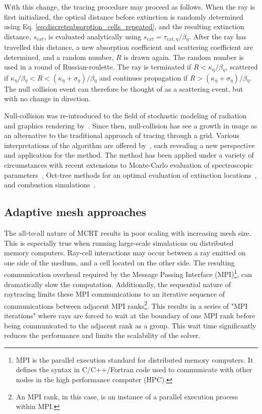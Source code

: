 With this change, the tracing procedure may proceed as follows. When the ray is first initialized, the optical distance before extinction is randomly determined using Eq. \ref{eq:discreteabsorption_cells_repeated}, and the resulting extinction distance, $s_{ext}$, is evaluated analytically using $s_{ext}=\tau{}_{ext,\eta}/\beta{}_\eta{}$.
After the ray has travelled this distance, a new absorption coefficient and scattering coefficient are determined, and a random number, $R$ is drawn again.
The random number is used in a round of Russian-roulette.
The ray is terminated if $R<\kappa{}_\eta{}/\beta{}_\eta{}$, scattered if $\kappa{}_\eta{}/\beta{}_\eta{}<R<(\kappa{}_\eta{}+\sigma{}_\eta{})/\beta{}_\eta{}$ and continues propagation if $R>(\kappa{}_\eta{}+\sigma{}_\eta{})/\beta{}_\eta{}$. 
The null collision event can therefore be thought of as a scattering event, but with no change in direction.

Null-collision was re-introduced to the field of stochastic modeling of radiation and graphics rendering by~\citet{Galtier2013IntegralAlgorithms}. Since then, null-collision has see a growth in usage as an alternative to the traditional approach of tracing through a grid. 
Various interpretations of the algorithm are offered by~\citet{ElHafi2021ThreeAlgorithms}, each revealing a new perspective and application for the method.
The method has been applied under a variety of circumstances with recent extensions to Monte-Carlo evaluation of spectroscopic parameters~\cite{Galtier2015RadiativeApproach}, Oct-tree methods for an optimal evaluation of extinction locations~\cite{Villefranque2019AAtmospheres}, and combustion simulations~\cite{Eymet2013Null-collisionSimulators}.


\subsection{Adaptive mesh approaches}\label{section:AdaptiveMeshApproaches}
The all-to-all nature of MCRT results in poor scaling with increasing mesh size. 
This is especially true when running large-scale simulations on distributed memory computers.
Ray-cell interactions may occur between a ray emitted on one side of the medium, and a cell located on the other side.
The resulting communication overhead required by the Message Passing Interface (MPI)\footnote{MPI is the parallel execution standard for distributed memory computers. It defines the syntax in C/C++/Fortran code used to communicate with other nodes in the high performance computer (HPC).}, can dramatically slow the computation. Additionally, the sequential nature of raytracing limits these MPI communications to an iterative sequence of communications between adjacent MPI ranks\footnote{An MPI rank, in this case, is an instance of a parallel execution process within MPI.}.
This results in a series of "MPI iterations" where rays are forced to wait at the boundary of one MPI rank before being communicated to the adjacent rank as a group. This wait time significantly reduces the performance and limits the scalability of the solver.

